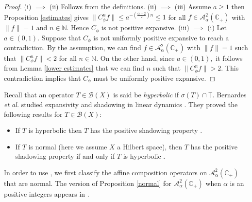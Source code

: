 \documentclass[11pt]{amsart}%
\numberwithin{equation}{section}
\theoremstyle{plain}
\theoremstyle{definition}
\theoremstyle{definition}
\newcommand{\hb}{\mathbb{C}_+}
\newcommand{\Ber}{\mathcal{A}^2_{\alpha}(\hb)}
\begin{document}
\begin{proof} (i) $\implies$ (ii) Follows from the definitions. (ii) $\implies$ (iii) Assume $a\geq1$ then Proposition \ref{estimates} gives $\|C^{n}_{\phi}f\| \leq a ^{-\left(\frac{\alpha+2}{2}\right)n}\leq 1$ for all $f\in \Ber$ with $\|f\|=1$ and $n\in\mathbb{N}.$ Hence $C_{\phi}$ is not positive expansive. (iii) $\implies$ (i) Let $a\in (0,1).$ Suppose that $C_{\phi}$ is not uniformly positive expansive to reach a contradiction. By the assumption, we can find $f\in \Ber$ with $\|f\|=1$ such that $\|C_{\phi}^nf\|<2$ for all $n\in \mathbb{N}.$ On the other hand, since $a\in (0,1),$ it follows from Lemma \ref{lower estimates} that we can find $n$ such that $\|C_{\phi}^nf\|>2.$ This contradiction implies that $C_{\phi}$ must be uniformly positive expansive.
\end{proof}


Recall that an operator $T\in \mathcal{B}(X)$ is said be \textit{hyperbolic} if $\sigma(T)\cap \mathbb{T}.$ Bernardes \textit{et al.} studied expansivity and shadowing in linear dynamics \cite{Bernardes}. They proved the following results for $T\in \mathcal{B}(X):$
\begin{itemize}
\item  If $T$ is hyperbolic then $T$ has the positive shadowing property \cite[Theorem 13]{Bernardes}.
\item If $T$ is normal (here we assume $X$ a Hilbert space), then $T$ has the positive shadowing property if and only if $T$ is hyperbolic \cite[Theorem 30]{Bernardes}.
\end{itemize}  

In order to use \cite[Theorem 30]{Bernardes}, we first classify the affine composition operators on $\Ber$ that are normal. The version of Proposition \ref{normal} for $\Ber$ when $\alpha$ is an positive integers appears in \cite[Theorem 8.7]{HS}.
\end{document}

